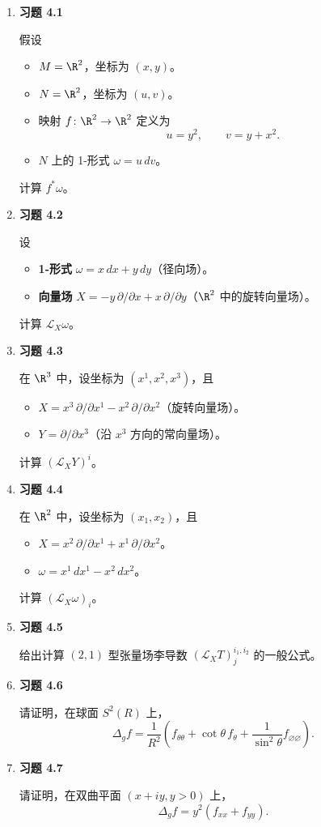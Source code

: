 \begin{enumerate}[itemsep=.5\baselineskip]
  \item \textbf{习题 4.1}\par\nopagebreak
  假设
  \begin{itemize}
    \item $M=\R^2$，坐标为 $(x,y)$。
    \item $N=\R^2$，坐标为 $(u,v)$。
    \item 映射 $f\colon\R^2\to\R^2$ 定义为
    \[
      u=y^2,\qquad v=y+x^2.
    \]
    \item $N$ 上的 1-形式 $\omega=u\,dv$。
  \end{itemize}
  计算 $f^*\omega$。

  \item \textbf{习题 4.2}\par\nopagebreak
  设
  \begin{itemize}
    \item \textbf{1-形式} $\omega=x\,dx+y\,dy$（径向场）。
    \item \textbf{向量场} $X=-y\,\partial/\partial x+x\,\partial/\partial y$（$\R^2$ 中的旋转向量场）。
  \end{itemize}
  计算 $\mathcal L_X\omega$。

  \item \textbf{习题 4.3}\par\nopagebreak
  在 $\R^3$ 中，设坐标为 $(x^1,x^2,x^3)$，且
  \begin{itemize}
    \item $X=x^3\,\partial/\partial x^1-x^2\,\partial/\partial x^2$（旋转向量场）。
    \item $Y=\partial/\partial x^3$（沿 $x^3$ 方向的常向量场）。
  \end{itemize}
  计算 $(\mathcal L_X Y)^i$。

  \item \textbf{习题 4.4}\par\nopagebreak
  在 $\R^2$ 中，设坐标为 $(x_1,x_2)$，且
  \begin{itemize}
    \item $X=x^2\,\partial/\partial x^1+x^1\,\partial/\partial x^2$。
    \item $\omega=x^1\,dx^1-x^2\,dx^2$。
  \end{itemize}
  计算 $(\mathcal L_X\omega)_i$。

  \item \textbf{习题 4.5}\par\nopagebreak
  给出计算 $(2,1)$ 型张量场李导数 $(\mathcal L_X T)^{i_1,i_2}_{j}$ 的一般公式。

  \item \textbf{习题 4.6}\par\nopagebreak
  请证明，在球面 $S^2(R)$ 上，
  \[
    \Delta_g f=\frac1{R^2}\left(f_{\theta\theta}+\cot\theta\,f_\theta
                   +\frac1{\sin^2\theta}f_{\varnothing\varnothing}\right).
  \]

  \item \textbf{习题 4.7}\par\nopagebreak
  请证明，在双曲平面 $(x+iy,y>0)$ 上，
  \[
    \Delta_g f=y^2(f_{xx}+f_{yy}).
  \]
\end{enumerate}

